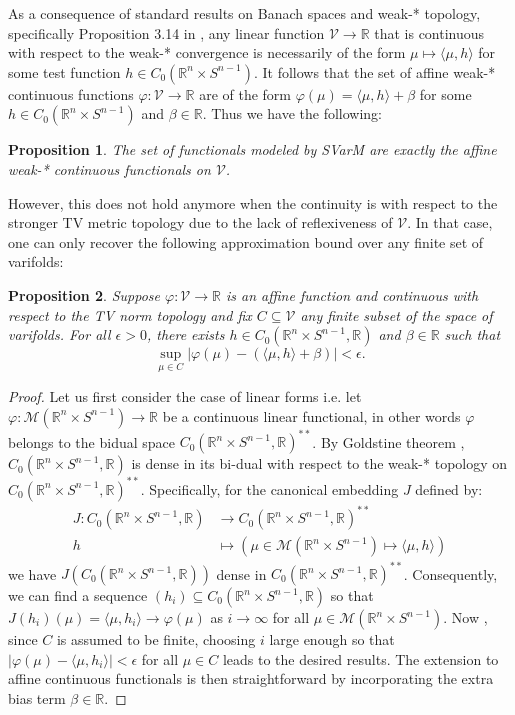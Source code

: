\documentclass[11pt]{article}
\newtheorem{proposition}{Proposition}
\newcommand{\R}{\mathbb{R}}
\begin{document}
As a consequence of standard results on Banach spaces and weak-* topology, specifically Proposition 3.14 in \cite{brezis2011functional}, any linear function  $\mathcal{V} \rightarrow \R$ that is continuous with respect to the weak-* convergence is necessarily of the form $\mu \mapsto \langle \mu, h \rangle $ for some test function $h \in C_0(\R^n \times S^{n-1})$. It follows that the set of affine weak-* continuous functions $\varphi:\mathcal{V} \rightarrow \R$ are of the form $\varphi(\mu) = \langle \mu,h\rangle +\beta$ for some $h \in C_0(\R^n \times S^{n-1})$ and $\beta \in \R$. Thus we have the following:
\begin{proposition}
\label{prop:SVarM_affine_maps}
    The set of functionals modeled by SVarM are exactly the affine weak-* continuous functionals on $\mathcal{V}$. 
\end{proposition}
However, this does not hold anymore when the continuity is with respect to the stronger TV metric topology due to the lack of reflexiveness of $\mathcal{V}$. In that case, one can only recover the following approximation bound over any finite set of varifolds:
\begin{proposition}
    Suppose $\varphi:\mathcal{V} \to \R$ is an affine function and continuous with respect to the TV norm topology and fix $C\subseteq \mathcal{V}$ any finite subset of the space of varifolds. For all $\epsilon>0$, there exists $h\in C_0(\R^n\times S^{n-1},\R)$ and $\beta \in \R$ such that 
    $$\sup_{\mu\in C}\left|\varphi(\mu) - (\langle \mu, h\rangle + \beta)\right|<\epsilon.$$
\end{proposition}
\begin{proof}
    Let us first consider the case of linear forms i.e. let $\varphi: \mathcal{M}(\R^n\times S^{n-1}) \to \R$ be a continuous linear functional, in other words $\varphi$ belongs to the bidual space $C_0(\R^n\times S^{n-1},\R)^{**}$.  By Goldstine theorem \cite{rudin1991functional}, $C_0(\R^n\times S^{n-1},\R)$ is dense in its bi-dual with respect to the weak-* topology on $C_0(\R^n\times S^{n-1},\R)^{**}$. Specifically, for the canonical embedding $J$ defined by:
    \begin{align}
        J:C_0(\R^n\times S^{n-1},\R)&\to C_0(\R^n\times S^{n-1},\R)^{**} \\
        h&\mapsto (\mu \in\mathcal{M}(\R^n\times S^{n-1}) \mapsto \langle \mu , h \rangle)
    \end{align} 
    we have $J(C_0(\R^n\times S^{n-1},\R))$ dense in $C_0(\R^n\times S^{n-1},\R)^{**}$. Consequently, we can find a sequence $(h_i)\subseteq C_0(\R^n\times S^{n-1},\R)$ so that $J(h_i)(\mu)=\langle \mu , h_i \rangle \to \varphi(\mu)$ as $i \rightarrow \infty$ for all $\mu\in\mathcal{M}(\R^n\times S^{n-1})$. Now , since $C$ is assumed to be finite, choosing $i$ large enough so that $|\varphi(\mu)-\langle \mu , h_i \rangle| < \epsilon$ for all $\mu \in C$ leads to the desired results. The extension to affine continuous functionals is then straightforward by incorporating the extra bias term $\beta \in \R$.
\end{proof}
\end{document}
